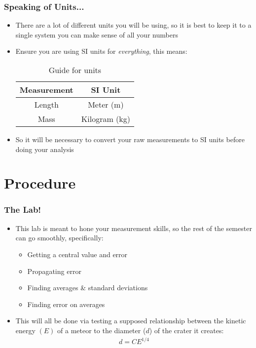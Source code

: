 \documentclass[aspectratio=169]{beamer}
\begin{document}
\begin{frame}
  \frametitle{Speaking of Units...}
  \begin{itemize}
  \item There are a lot of different units you will be using, so it is best to keep it to a single system you can make sense of all your numbers
  \item Ensure you are using SI units for \emph{everything}, this means:
    \begin{table}[H]
      \centering
      \begin{tabular}{c|c}
        Measurement & SI Unit \\\hline
        Length      & Meter (m) \\
        Mass        & Kilogram (kg)
      \end{tabular}
      \caption{Guide for units}
    \end{table}
  \item So it will be necessary to convert your raw measurements to SI units before doing your analysis
  \end{itemize}
\end{frame}

\section{Procedure}
\begin{frame}
  \frametitle{The Lab!}
  \begin{itemize}
  \item This lab is meant to hone your measurement skills, so the rest of the semester can go smoothly, specifically:
    \begin{itemize}
    \item Getting a central value and error
    \item Propagating error
    \item Finding averages \& standard deviations
    \item Finding error on averages
    \end{itemize}
  \item This will all be done via testing a supposed relationship between the kinetic energy $(E)$ of a meteor to the diameter ($d$) of the crater it creates:
    \begin{align*}
      d=CE^{1/4}
    \end{align*}
  \end{itemize}
\end{frame}
\end{document}
